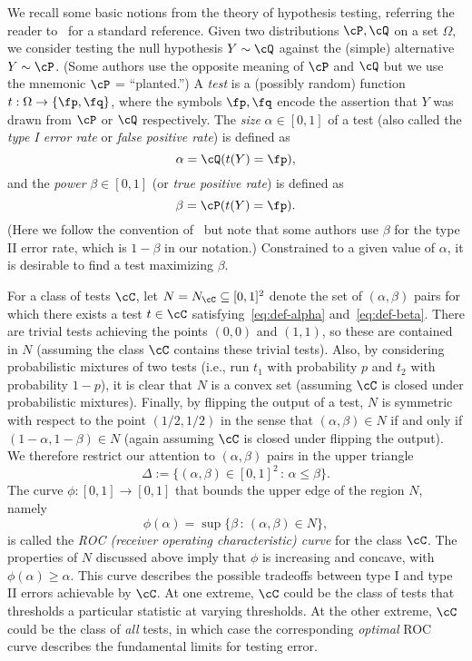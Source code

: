 \documentclass[11pt]{article}
\begin{document}
We recall some basic notions from the theory of hypothesis testing, referring the reader to~\cite{testing-book} for a standard reference. Given two distributions $\cP,\cQ$ on a set $\Omega$, we consider testing the null hypothesis $Y \sim \cQ$ against the (simple) alternative $Y \sim \cP$. (Some authors use the opposite meaning of $\cP$ and $\cQ$ but we use the mnemonic $\cP$ = ``planted.'') A \emph{test} is a (possibly random) function $t: \Omega \to \{\fp,\fq\}$, where the symbols $\fp,\fq$ encode the assertion that $Y$ was drawn from $\cP$ or $\cQ$ respectively. The \emph{size} $\alpha \in [0,1]$ of a test (also called the \emph{type I error rate} or \emph{false positive rate}) is defined as
\begin{equation}\label{eq:def-alpha}
\alpha = \cQ(t(Y) = \fp),
\end{equation}
and the \emph{power} $\beta \in [0,1]$ (or \emph{true positive rate}) is defined as
\begin{equation}\label{eq:def-beta}
\beta = \cP(t(Y) = \fp).
\end{equation}
(Here we follow the convention of~\cite{testing-book} but note that some authors use $\beta$ for the type II error rate, which is $1-\beta$ in our notation.) Constrained to a given value of $\alpha$, it is desirable to find a test maximizing $\beta$.

For a class of tests $\cC$, let $N = N_\cC \subseteq [0,1]^2$ denote the set of $(\alpha,\beta)$ pairs for which there exists a test $t \in \cC$ satisfying~\eqref{eq:def-alpha} and~\eqref{eq:def-beta}. There are trivial tests achieving the points $(0,0)$ and $(1,1)$, so these are contained in $N$ (assuming the class $\cC$ contains these trivial tests). Also, by considering probabilistic mixtures of two tests (i.e., run $t_1$ with probability $p$ and $t_2$ with probability $1-p$), it is clear that $N$ is a convex set (assuming $\cC$ is closed under probabilistic mixtures). Finally, by flipping the output of a test, $N$ is symmetric with respect to the point $(1/2,1/2)$ in the sense that $(\alpha,\beta) \in N$ if and only if $(1-\alpha,1-\beta) \in N$ (again assuming $\cC$ is closed under flipping the output). We therefore restrict our attention to $(\alpha,\beta)$ pairs in the upper triangle
\[ \Delta := \{(\alpha,\beta) \in [0,1]^2 \,:\, \alpha \le \beta\}. \]
The curve $\phi: [0,1] \to [0,1]$ that bounds the upper edge of the region $N$, namely
\[ \phi(\alpha) = \sup\{\beta \,:\, (\alpha,\beta) \in N\}, \]
is called the \emph{ROC (receiver operating characteristic) curve} for the class $\cC$. The properties of $N$ discussed above imply that $\phi$ is increasing and concave, with $\phi(\alpha) \ge \alpha$. This curve describes the possible tradeoffs between type I and type II errors achievable by $\cC$. At one extreme, $\cC$ could be the class of tests that thresholds a particular statistic at varying thresholds. At the other extreme, $\cC$ could be the class of \emph{all} tests, in which case the corresponding \emph{optimal} ROC curve describes the fundamental limits for testing error.
\end{document}
